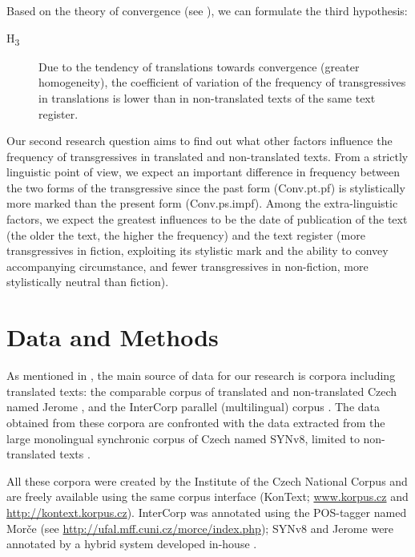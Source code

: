 \documentclass[output=paper,russian]{langsci/langscibook}
\begin{document}
Based on the theory of convergence (see ), we can formulate the third hypothesis:

\begin{description}
  \item[H\textsubscript{3}] Due to the tendency of translations towards convergence (greater homogeneity), the coefficient of variation of the frequency of transgressives in translations is lower than in non-translated texts of the same text register.
\end{description}

Our second research question aims to find out what other factors influence the frequency of transgressives in translated and non-translated texts. From a strictly linguistic point of view, we expect an important difference in frequency between the two forms of the transgressive since the past form (Conv.pt.pf) is stylistically more marked than the present form (Conv.ps.impf). Among the extra-linguistic factors, we expect the greatest influences to be the date of publication of the text (the older the text, the higher the frequency) and the text register (more transgressives in fiction, exploiting its stylistic mark and the ability to convey accompanying circumstance, and fewer transgressives in non-fiction, more stylistically neutral than fiction).

\section{Data and Methods}\label{olga:data}

As mentioned in , the main source of data for our research is corpora including translated texts: the comparable corpus of translated and non-translated Czech named Jerome \parencite{chlumska13}, and the InterCorp parallel (multilingual) corpus \parencite{rosetal19}. The data obtained from these corpora are confronted with the data extracted from the large monolingual synchronic corpus of Czech named SYNv8, limited to non-translated texts \parencite{kreetal19}.

All these corpora were created by the Institute of the Czech National Corpus and are freely available using the same corpus interface (KonText; \url{www.korpus.cz} and \url{http://kontext.korpus.cz}). InterCorp was annotated using the POS-tagger named Morče (see \url{http://ufal.mff.cuni.cz/morce/index.php}); SYNv8 and Jerome were annotated by a hybrid system developed in-house \parencite[combining stochastic and rule-based disambiguation, see][]{hnaetal11}.
\end{document}
